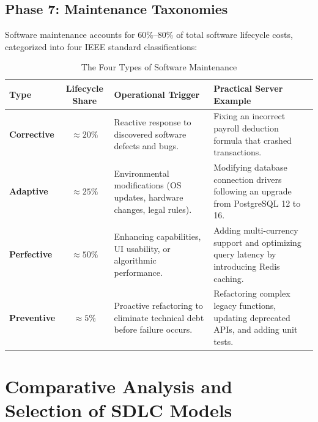 \subsection{Phase 7: Maintenance Taxonomies}
Software maintenance accounts for $60\%\text{--}80\%$ of total software lifecycle costs, categorized into four IEEE standard classifications:
\begin{table}[htbp]
\centering
\small
\caption{The Four Types of Software Maintenance}
\label{tab:maintenance_types}
\begin{tabularx}{\textwidth}{l c p{4.2cm} X}
\toprule
\textbf{Type} & \textbf{Lifecycle Share} & \textbf{Operational Trigger} & \textbf{Practical Server Example} \\
\midrule
\textbf{Corrective} & $\approx 20\%$ & Reactive response to discovered software defects and bugs. & Fixing an incorrect payroll deduction formula that crashed transactions. \\
\textbf{Adaptive} & $\approx 25\%$ & Environmental modifications (OS updates, hardware changes, legal rules). & Modifying database connection drivers following an upgrade from PostgreSQL 12 to 16. \\
\textbf{Perfective} & $\approx 50\%$ & Enhancing capabilities, UI usability, or algorithmic performance. & Adding multi-currency support and optimizing query latency by introducing Redis caching. \\
\textbf{Preventive} & $\approx 5\%$ & Proactive refactoring to eliminate technical debt before failure occurs. & Refactoring complex legacy functions, updating deprecated APIs, and adding unit tests. \\
\bottomrule
\end{tabularx}
\end{table}

\section{Comparative Analysis and Selection of SDLC Models}
\label{sec:se_sdlc_selection}

